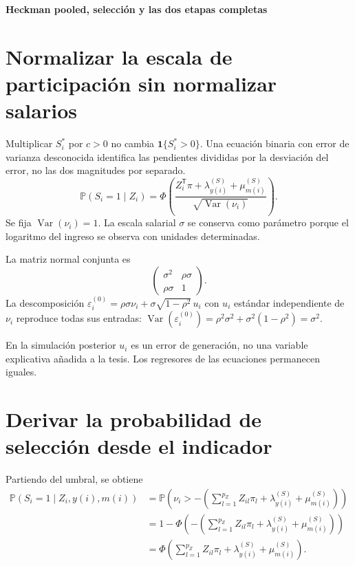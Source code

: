 \documentclass[11pt,a4paper]{article}
\newcommand{\Prob}{\mathbb P}
\DeclareMathOperator{\Var}{Var}
\begin{document}
\clearpage
{}
{\large\bfseries\color{azul}Heckman pooled, selección y las dos etapas completas}\par\vspace{2mm}
\section{Normalizar la escala de participación sin normalizar salarios}

Multiplicar $S_i^*$ por $c>0$ no cambia $\mathbf1\{S_i^*>0\}$. Una ecuación binaria con error de varianza desconocida identifica las pendientes divididas por la desviación del error, no las dos magnitudes por separado.
\[
\Prob(S_i=1\mid Z_i)
=\Phi\left(
\frac{Z_i^{\mathsf T}\pi+\lambda_{y(i)}^{(S)}+\mu_{m(i)}^{(S)}}
{\sqrt{\Var(\nu_i)}}\right).
\]
Se fija $\Var(\nu_i)=1$. La escala salarial $\sigma$ se conserva como parámetro porque el logaritmo del ingreso se observa con unidades determinadas.

La matriz normal conjunta es
\[
\begin{pmatrix}\sigma^2&\rho\sigma\\\rho\sigma&1\end{pmatrix}.
\]
La descomposición
$\varepsilon_i^{(0)}=\rho\sigma\nu_i+
\sigma\sqrt{1-\rho^2}\,u_i$
con $u_i$ estándar independiente de $\nu_i$ reproduce todas sus entradas:
$\Var(\varepsilon_i^{(0)})=\rho^2\sigma^2+\sigma^2(1-\rho^2)=\sigma^2$.

En la simulación posterior $u_i$ es un error de generación, no una variable explicativa añadida a la tesis. Los regresores de las ecuaciones permanecen iguales.

\clearpage
\section{Derivar la probabilidad de selección desde el indicador}
Partiendo del umbral, se obtiene
\[
\begin{aligned}
\Prob(S_i=1\mid Z_i,y(i),m(i))
&=\Prob\left(\nu_i>-(\sum_{l=1}^{p_Z}Z_{il}\pi_l+\lambda_{y(i)}^{(S)}+\mu_{m(i)}^{(S)})\right)\\
&=1-\Phi\left(-(\sum_{l=1}^{p_Z}Z_{il}\pi_l+\lambda_{y(i)}^{(S)}+\mu_{m(i)}^{(S)})\right)\\
&=\Phi\left(\sum_{l=1}^{p_Z}Z_{il}\pi_l+\lambda_{y(i)}^{(S)}+\mu_{m(i)}^{(S)}\right).
\end{aligned}
\]
\end{document}
